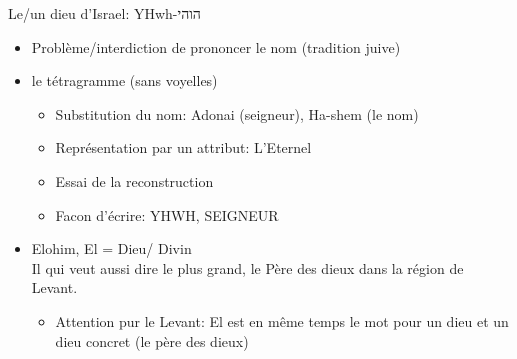 \begin{parag}{Le/un dieu d'Israel: YHwh-הוהי}
	\begin{itemize}
		\item Problème/interdiction de prononcer le nom (tradition juive)
		\item le tétragramme (sans voyelles)
			\begin{itemize}
				\item Substitution du nom: Adonai (seigneur), Ha-shem (le nom)
				\item Représentation par un attribut: L'Eternel
				\item Essai de la reconstruction
				\item Facon d'écrire: YHWH, SEIGNEUR
			\end{itemize}
		\item Elohim, El = Dieu/ Divin \\
			Il qui veut aussi dire le plus grand, le Père des dieux dans la région de Levant.
			\begin{itemize}
				\item Attention pur le Levant: El est en même temps le mot pour un dieu et un dieu concret (le père des dieux)
			\end{itemize}
	\end{itemize}
	
\end{parag}

